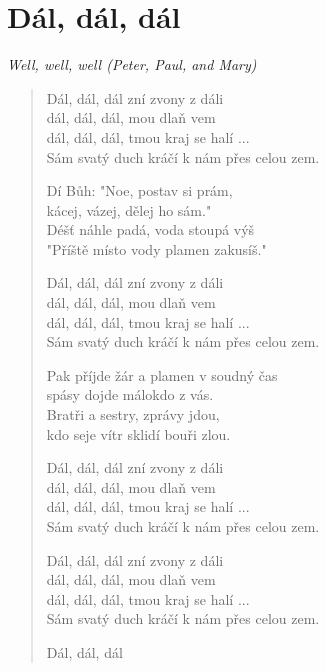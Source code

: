 \section{Dál, dál, dál}
\textit{Well, well, well (Peter, Paul, and Mary)}

\begin{verse}
Dál, dál, dál zní zvony z dáli \\
dál, dál, dál, mou dlaň vem \\
dál, dál, dál, tmou kraj se halí ... \\
Sám svatý duch kráčí k nám přes celou zem.

Dí Bůh: "Noe, postav si prám, \\
kácej, vázej, dělej ho sám." \\
Déšť náhle padá, voda stoupá výš \\
"Příště místo vody plamen zakusíš."

Dál, dál, dál zní zvony z dáli \\
dál, dál, dál, mou dlaň vem \\
dál, dál, dál, tmou kraj se halí ... \\
Sám svatý duch kráčí k nám přes celou zem.

Pak příjde žár a plamen v soudný čas \\ 
spásy dojde málokdo z vás. \\
Bratři a sestry, zprávy jdou, \\
kdo seje vítr sklidí bouři zlou. 

Dál, dál, dál zní zvony z dáli \\
dál, dál, dál, mou dlaň vem \\
dál, dál, dál, tmou kraj se halí ... \\
Sám svatý duch kráčí k nám přes celou zem.

Dál, dál, dál zní zvony z dáli \\
dál, dál, dál, mou dlaň vem \\
dál, dál, dál, tmou kraj se halí ... \\
Sám svatý duch kráčí k nám přes celou zem.

Dál, dál, dál
\end{verse}
